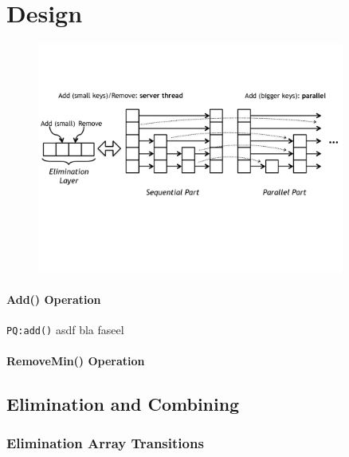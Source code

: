 
\section{Design}




\begin{figure}[htb]
	\centering
	\includegraphics[width=0.9\textwidth]{graphics/pqe.pdf}
	\caption{\cite{calciu_adaptive_2014}}
	\label{fig:pqe}
\end{figure}

\paragraph{Add() Operation}

\texttt{PQ:add()} asdf bla faseel

\paragraph{RemoveMin() Operation}

\subsection{Elimination and Combining}

\subsubsection{Elimination Array Transitions}

